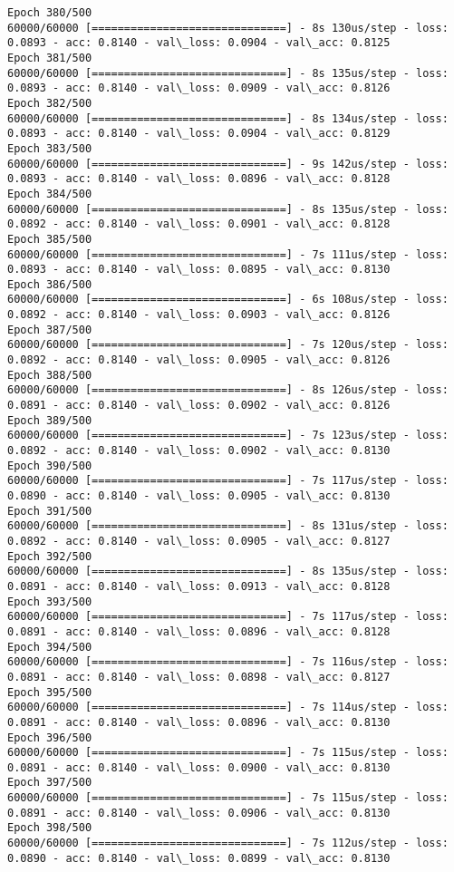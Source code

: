 \documentclass[11pt]{article}
\begin{document}
\begin{Verbatim}[commandchars=\\\{\}]
Epoch 380/500
60000/60000 [==============================] - 8s 130us/step - loss: 0.0893 - acc: 0.8140 - val\_loss: 0.0904 - val\_acc: 0.8125
Epoch 381/500
60000/60000 [==============================] - 8s 135us/step - loss: 0.0893 - acc: 0.8140 - val\_loss: 0.0909 - val\_acc: 0.8126
Epoch 382/500
60000/60000 [==============================] - 8s 134us/step - loss: 0.0893 - acc: 0.8140 - val\_loss: 0.0904 - val\_acc: 0.8129
Epoch 383/500
60000/60000 [==============================] - 9s 142us/step - loss: 0.0893 - acc: 0.8140 - val\_loss: 0.0896 - val\_acc: 0.8128
Epoch 384/500
60000/60000 [==============================] - 8s 135us/step - loss: 0.0892 - acc: 0.8140 - val\_loss: 0.0901 - val\_acc: 0.8128
Epoch 385/500
60000/60000 [==============================] - 7s 111us/step - loss: 0.0893 - acc: 0.8140 - val\_loss: 0.0895 - val\_acc: 0.8130
Epoch 386/500
60000/60000 [==============================] - 6s 108us/step - loss: 0.0892 - acc: 0.8140 - val\_loss: 0.0903 - val\_acc: 0.8126
Epoch 387/500
60000/60000 [==============================] - 7s 120us/step - loss: 0.0892 - acc: 0.8140 - val\_loss: 0.0905 - val\_acc: 0.8126
Epoch 388/500
60000/60000 [==============================] - 8s 126us/step - loss: 0.0891 - acc: 0.8140 - val\_loss: 0.0902 - val\_acc: 0.8126
Epoch 389/500
60000/60000 [==============================] - 7s 123us/step - loss: 0.0892 - acc: 0.8140 - val\_loss: 0.0902 - val\_acc: 0.8130
Epoch 390/500
60000/60000 [==============================] - 7s 117us/step - loss: 0.0890 - acc: 0.8140 - val\_loss: 0.0905 - val\_acc: 0.8130
Epoch 391/500
60000/60000 [==============================] - 8s 131us/step - loss: 0.0892 - acc: 0.8140 - val\_loss: 0.0905 - val\_acc: 0.8127
Epoch 392/500
60000/60000 [==============================] - 8s 135us/step - loss: 0.0891 - acc: 0.8140 - val\_loss: 0.0913 - val\_acc: 0.8128
Epoch 393/500
60000/60000 [==============================] - 7s 117us/step - loss: 0.0891 - acc: 0.8140 - val\_loss: 0.0896 - val\_acc: 0.8128
Epoch 394/500
60000/60000 [==============================] - 7s 116us/step - loss: 0.0891 - acc: 0.8140 - val\_loss: 0.0898 - val\_acc: 0.8127
Epoch 395/500
60000/60000 [==============================] - 7s 114us/step - loss: 0.0891 - acc: 0.8140 - val\_loss: 0.0896 - val\_acc: 0.8130
Epoch 396/500
60000/60000 [==============================] - 7s 115us/step - loss: 0.0891 - acc: 0.8140 - val\_loss: 0.0900 - val\_acc: 0.8130
Epoch 397/500
60000/60000 [==============================] - 7s 115us/step - loss: 0.0891 - acc: 0.8140 - val\_loss: 0.0906 - val\_acc: 0.8130
Epoch 398/500
60000/60000 [==============================] - 7s 112us/step - loss: 0.0890 - acc: 0.8140 - val\_loss: 0.0899 - val\_acc: 0.8130

\end{Verbatim}
\end{document}
